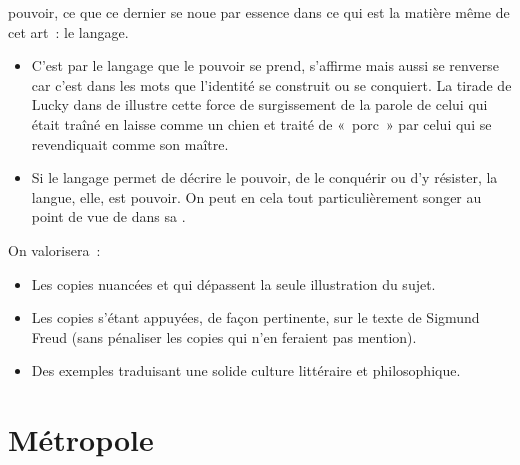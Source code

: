 {\begin{itemize}[label=\textbullet]
pouvoir, ce que ce dernier se noue par essence dans ce qui est la
matière même de cet art~: le langage.
\begin{itemize}[label=]
\item C'est par le langage que le pouvoir se prend, s'affirme mais aussi se
renverse car c'est dans les mots que l'identité se construit ou se
conquiert. La tirade de Lucky dans  de  illustre
cette force de surgissement de la parole de celui qui était traîné en laisse
comme un chien et traité de «~porc~» par celui qui se revendiquait comme
son maître.
\item Si le langage permet de décrire le pouvoir, de le conquérir ou d'y résister,
la langue, elle, est pouvoir. On peut en cela tout particulièrement songer
au point de vue de  dans sa .
\end{itemize}
\end{itemize}

On valorisera~:
\begin{itemize}
\item Les copies nuancées et qui dépassent la seule illustration du sujet.
\item Les copies s'étant appuyées, de façon pertinente, sur le texte de Sigmund Freud
(sans pénaliser les copies qui n'en feraient pas mention).
\item Des exemples traduisant une solide culture littéraire et philosophique.
\end{itemize}}

\section{Métropole}

